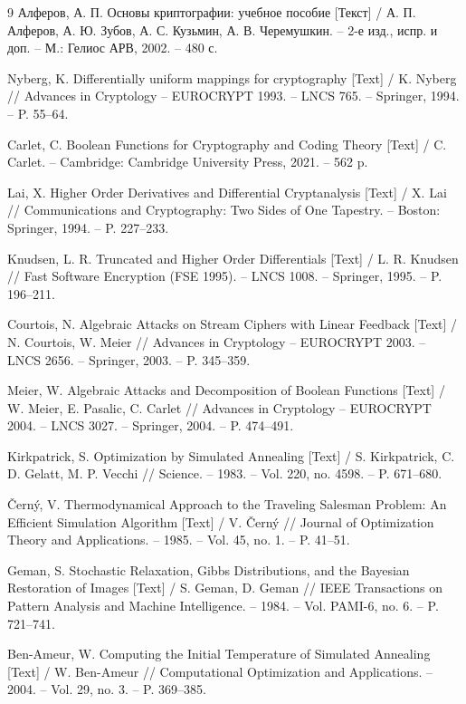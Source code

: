 \begin{thebibliography}{9}
Алферов, А. П. Основы криптографии: учебное пособие [Текст] / А. П. Алферов, А. Ю. Зубов, А. С. Кузьмин, А. В. Черемушкин. – 2-е изд., испр. и доп. – М.: Гелиос АРВ, 2002. – 480 с.

Nyberg, K. Differentially uniform mappings for cryptography [Text] / K. Nyberg // Advances in Cryptology – EUROCRYPT 1993. – LNCS 765. – Springer, 1994. – P. 55–64.

Carlet, C. Boolean Functions for Cryptography and Coding Theory [Text] / C. Carlet. – Cambridge: Cambridge University Press, 2021. – 562 p.

Lai, X. Higher Order Derivatives and Differential Cryptanalysis [Text] / X. Lai // Communications and Cryptography: Two Sides of One Tapestry. – Boston: Springer, 1994. – P. 227–233.

Knudsen, L. R. Truncated and Higher Order Differentials [Text] / L. R. Knudsen // Fast Software Encryption (FSE 1995). – LNCS 1008. – Springer, 1995. – P. 196–211.

Courtois, N. Algebraic Attacks on Stream Ciphers with Linear Feedback [Text] / N. Courtois, W. Meier // Advances in Cryptology – EUROCRYPT 2003. – LNCS 2656. – Springer, 2003. – P. 345–359.

Meier, W. Algebraic Attacks and Decomposition of Boolean Functions [Text] / W. Meier, E. Pasalic, C. Carlet // Advances in Cryptology – EUROCRYPT 2004. – LNCS 3027. – Springer, 2004. – P. 474–491.

Kirkpatrick, S. Optimization by Simulated Annealing [Text] / S. Kirkpatrick, C. D. Gelatt, M. P. Vecchi // Science. – 1983. – Vol. 220, no. 4598. – P. 671–680.

Černý, V. Thermodynamical Approach to the Traveling Salesman Problem: An Efficient Simulation Algorithm [Text] / V. Černý // Journal of Optimization Theory and Applications. – 1985. – Vol. 45, no. 1. – P. 41–51.

Geman, S. Stochastic Relaxation, Gibbs Distributions, and the Bayesian Restoration of Images [Text] / S. Geman, D. Geman // IEEE Transactions on Pattern Analysis and Machine Intelligence. – 1984. – Vol. PAMI-6, no. 6. – P. 721–741.

Ben-Ameur, W. Computing the Initial Temperature of Simulated Annealing [Text] / W. Ben-Ameur // Computational Optimization and Applications. – 2004. – Vol. 29, no. 3. – P. 369–385.


\end{thebibliography}
